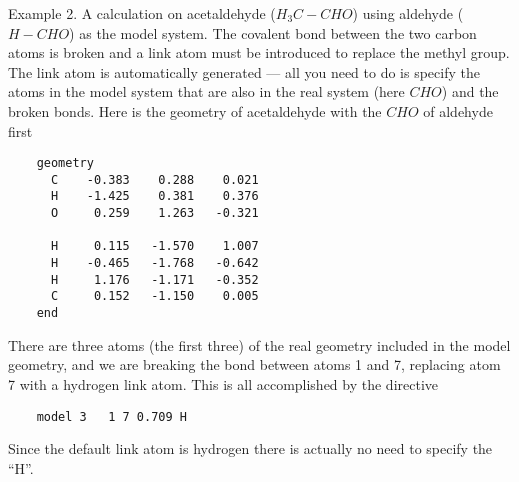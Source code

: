 Example 2.  A calculation on acetaldehyde ($H_3C-CHO$) using aldehyde
($H-CHO$) as the model system. The covalent bond between the two
carbon atoms is broken and a link atom must be introduced to replace
the methyl group.  The link atom is automatically generated --- all
you need to do is specify the atoms in the model system that are also
in the real system (here $CHO$) and the broken bonds.  Here is the
geometry of acetaldehyde with the $CHO$ of aldehyde first
\begin{verbatim}
    geometry
      C    -0.383    0.288    0.021
      H    -1.425    0.381    0.376
      O     0.259    1.263   -0.321

      H     0.115   -1.570    1.007
      H    -0.465   -1.768   -0.642
      H     1.176   -1.171   -0.352
      C     0.152   -1.150    0.005
    end
\end{verbatim}
There are three atoms (the first three) of the real geometry included
in the model geometry, and we are breaking the bond between atoms 1
and 7, replacing atom 7 with a hydrogen link atom.  This is all
accomplished by the directive
\begin{verbatim}
    model 3   1 7 0.709 H
\end{verbatim}
Since the default link atom is hydrogen there is actually no need to
specify the ``H''.

